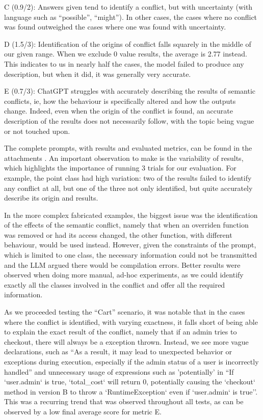 C (0.9/2): Answers given tend to identify a conflict, but with uncertainty (with language such as ``possible'', ``might''). In other cases, the cases where no conflict was found outweighed the cases where one was found with uncertainty.

D (1.5/3): Identification of the origins of conflict falls squarely in the middle of our given range.  When we exclude 0 value results, the average is 2.77 instead. This indicates to us in nearly half the cases, the model failed to produce any description, but when it did, it was generally very accurate.

E (0.7/3): ChatGPT struggles with accurately describing the results of semantic conflicts, ie, how the behaviour is specifically altered and how the outputs change. Indeed, even when the origin of the conflict is found, an accurate description of the results does not necessarily follow, with the topic being vague or not touched upon.

The complete prompts, with results and evaluated metrics, can be found in the attachments .
An important observation to make is the variability of results, which highlights the importance of running 3 trials for our evaluation.
For example, the point class had high variation: two of the results failed to identify any conflict at all, but one of the three not only identified, but quite accurately describe its origin and results.

In the more complex fabricated examples, the biggest issue was the identification of the effects of the semantic conflict, namely that when an overriden function was removed or had its access changed, the other function, with different behaviour, would be used instead. However, given the constraints of the prompt, which is limited to one class, the necessary information could not be transmitted and the LLM argued there would be compilation errors. 
Better results were observed when doing more manual, ad-hoc experiments, as we could identify exactly all the classes involved in the conflict and offer all the required information.

As we proceeded testing the ``Cart'' scenario, it was notable that in the cases where the conflict is identified, with varying exactness, it falls short of being able to explain the exact result of the conflict, namely that if an admin tries to checkout, there will always be a exception thrown. Instead, we see more vague declarations, such as ``As a result, it may lead to unexpected behavior or exceptions during execution, especially if the admin status of a user is incorrectly handled'' and unnecessary usage of expressions such as 'potentially' in ``If `user.admin` is true, `total\_cost` will return 0, potentially causing the `checkout` method in version B to throw a `RuntimeException` even if `user.admin` is true''.
This was a recurring trend that was observed throughout all tests, as can be observed by a low final average score for metric E.

